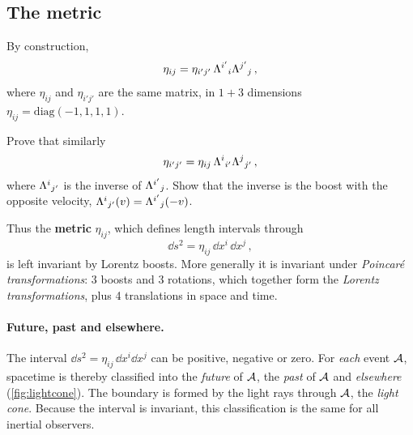 \subsection{The metric}
\label{sec:sr_metric}

By construction,
\begin{equation}
    \eta_{ij} = \eta_{i'j'}\, \Lambda^{i'}{}_{i} \Lambda^{j'}{}_{j} \, ,
    \label{eq:eta_invariance}
\end{equation}
where $\eta_{ij}$ and $\eta_{i'j'}$ are the same matrix, in $1+3$ dimensions
$\eta_{ij} = \mathrm{diag}(-1, 1, 1, 1)$.

\begin{exercise}
    Prove that similarly
    \begin{equation}
        \eta_{i'j'} = \eta_{ij}\, \Lambda^{i}{}_{i'} \Lambda^{j}{}_{j'} \, ,
    \end{equation}
    where $\Lambda^{i}{}_{j'}$ is the inverse of $\Lambda^{i'}{}_{j}$. Show that the inverse is the boost with
    the opposite velocity, $\Lambda^{i}{}_{j'}(v) = \Lambda^{i'}{}_{j}(-v)$.
\end{exercise}

Thus the \textbf{metric} $\eta_{ij}$, which defines length intervals through
\begin{equation}
    \dd s^2 = \eta_{ij}\, \dd x^i\, \dd x^j \, ,
    \label{eq:line_element}
\end{equation}
is left invariant by Lorentz boosts. More generally it is invariant under \emph{Poincar\'e
transformations}: 3 boosts and 3 rotations, which together form the \emph{Lorentz
transformations}, plus 4 translations in space and time.

\paragraph{Future, past and elsewhere.}
The interval $\dd s^2 = \eta_{ij}\, \dd x^i \dd x^j$ can be positive, negative or zero. For
\emph{each} event $\mathcal{A}$, spacetime is thereby classified into the \emph{future} of $\mathcal{A}$,
the \emph{past} of $\mathcal{A}$ and \emph{elsewhere} (\cref{fig:lightcone}). The boundary is formed by
the light rays through $\mathcal{A}$, the \emph{light cone}. Because the interval is invariant, this
classification is the same for all inertial observers.

